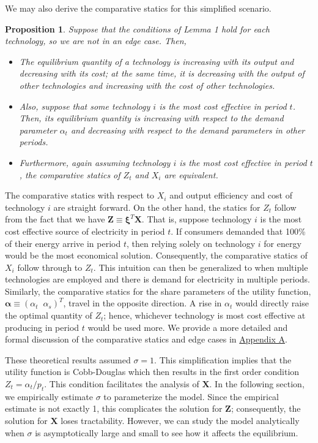 \documentclass[11pt,a4paper,leqno]{extarticle}
\newtheorem{proposition}{Proposition}
\begin{document}
	We may also derive the comparative statics for this simplified scenario.  
	\begin{proposition}
		Suppose that the conditions of Lemma 1 hold for each technology, so we are not in an edge case. Then, 
		\begin{itemize}
			\item The equilibrium quantity of a technology is increasing with its output and decreasing with its cost; at the same time, it is decreasing with the output of other technologies and increasing with the cost of other technologies. 
			\item Also, suppose that some technology $i$ is the most cost effective in period $t$. Then, its equilibrium quantity is increasing with respect to the demand parameter $\alpha_t$ and decreasing with respect to the demand parameters in other periods. 
			\item Furthermore, again assuming technology $i$ is the most cost effective in period $t$, the comparative statics of $Z_t$ and $X_i$ are equivalent. 
		\end{itemize}
	\end{proposition}		
	The comparative statics with respect to $X_i$ and output efficiency and cost of technology $i$ are straight forward. On the other hand, the statics for $Z_t$  follow from the fact that we have $\mathbf{Z} \equiv \boldsymbol{\xi}^T \mathbf{X}$. That is, suppose technology $i$ is the most cost effective source of electricity in period $t$. If consumers demanded that 100\% of their energy arrive in period $t$, then relying solely on technology $i$ for energy would be the most economical solution. Consequently, the comparative statics of $X_i$ follow through to $Z_t$. This intuition can then be generalized to when multiple technologies are employed and there is demand for electricity in multiple periods. Similarly, the comparative statics for the share parameters of the utility function, $\boldsymbol{\alpha} \equiv \left( \alpha_t \;\; \alpha_s \right)^T$, travel in the opposite direction. A rise in $\alpha_t$ would directly raise the optimal quantity of $Z_t$; hence, whichever technology is most cost effective at producing in period $t$ would be used more. We provide a more detailed and formal discussion of the comparative statics and edge cases in \hyperref[sec:appendixa]{Appendix A}. 
	
	These theoretical results assumed $\sigma = 1$. This simplification implies that the utility function is Cobb-Douglas which then results in the first order condition $Z_t = \alpha_t/p_t$. This condition facilitates the analysis of $\mathbf{X}$. In the following section, we empirically estimate $\sigma$ to parameterize the model. Since the empirical estimate is not exactly 1, this complicates the solution for $\mathbf{Z}$; consequently, the solution for $\mathbf{X}$ loses tractability. However, we can study the model analytically when $\sigma$ is asymptotically large and small to see how it affects the equilibrium. 
		
\end{document}
